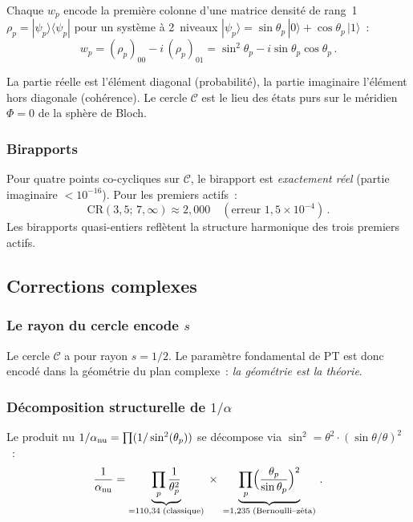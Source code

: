 \documentclass[12pt,a4paper]{article}
\begin{document}
Chaque $w_p$ encode la première colonne d'une matrice densité de
rang~1 $\rho_p = |\psi_p\rangle\langle\psi_p|$ pour un système à
2~niveaux $|\psi_p\rangle = \sin\theta_p\,|0\rangle +
\cos\theta_p\,|1\rangle$~:
\begin{equation}
  w_p = (\rho_p)_{00} - i\,(\rho_p)_{01}
  = \sin^2\theta_p - i\sin\theta_p\cos\theta_p\,.
  \label{eq:density}
\end{equation}

La partie réelle est l'élément diagonal (probabilité), la partie
imaginaire l'élément hors diagonale (cohérence). Le cercle
$\mathcal{C}$ est le lieu des états purs sur le méridien
$\Phi = 0$ de la sphère de Bloch.

\subsubsection{Birapports}

Pour quatre points co-cycliques sur $\mathcal{C}$, le birapport est
\emph{exactement réel} (partie imaginaire $< 10^{-16}$). Pour les
premiers actifs~:
\[
  \mathrm{CR}(3, 5;\, 7, \infty) \approx 2{,}000
  \quad (\text{erreur } 1{,}5 \times 10^{-4})\,.
\]
Les birapports quasi-entiers reflètent la structure harmonique des
trois premiers actifs.


\subsection{Corrections complexes}
\label{sec:cx_corrections}

\subsubsection{Le rayon du cercle encode \texorpdfstring{$s$}{s}}

Le cercle $\mathcal{C}$ a pour rayon $s = 1/2$. Le paramètre
fondamental de PT est donc encodé dans la géométrie du plan
complexe~: \emph{la géométrie est la théorie}.

\subsubsection{Décomposition structurelle de \texorpdfstring{$1/\alpha$}{1/alpha}}
\label{subsec:cx_bernoulli}

Le produit nu $1/\alpha_{\mathrm{nu}} = \prod(1/\sin^2(\theta_{p}))$
se décompose via $\sin^2 = \theta^2\cdot(\sin\theta/\theta)^2$~:
\begin{equation}
  \frac{1}{\alpha_{\mathrm{nu}}}
  = \underbrace{\prod_p \frac{1}{\theta_p^2}}_{= 110{,}34\;\text{(classique)}}
  \;\times\;
  \underbrace{\prod_p \Bigl(\frac{\theta_p}{\sin\theta_p}\Bigr)^2}_{= 1{,}235\;\text{(Bernoulli--zêta)}}\,.
  \label{eq:alpha_decomp}
\end{equation}
\end{document}

